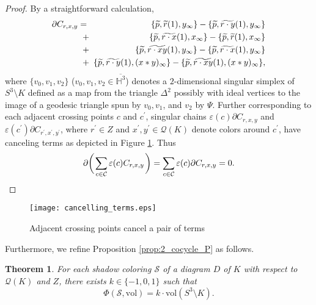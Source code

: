 \documentclass[12pt]{amsart}
\newtheorem{theorem}{Theorem}[section]
\theoremstyle{definition}
\begin{document}
\begin{proof}
By a straightforward calculation,
\begin{eqnarray*}
 \partial C_{r, x, y} = & \hskip -0.5em & \hskip -0.5em \{ \widetilde{p}, \widetilde{r}(1), y_{\infty} \} - \{ \widetilde{p}, \widetilde{r \cdot y}(1), y_{\infty} \} \\
 & \hskip -0.5em + & \hskip -0.5em \{ \widetilde{p}, \widetilde{r \cdot x}(1), x_{\infty} \} - \{ \widetilde{p}, \widetilde{r}(1), x_{\infty} \} \\
 & \hskip -0.5em + & \hskip -0.5em \{ \widetilde{p}, \widetilde{r \cdot x y}(1), y_{\infty} \} - \{ \widetilde{p}, \widetilde{r \cdot x}(1), y_{\infty} \} \\
 & \hskip -0.5em + & \hskip -0.5em \{ \widetilde{p}, \widetilde{r \cdot y}(1), (x \ast y)_{\infty} \} - \{ \widetilde{p}, \widetilde{r \cdot x y}(1), (x \ast y)_{\infty} \},
\end{eqnarray*}
where $\{ v_{0}, v_{1}, v_{2} \}$ ($v_{0}, v_{1}, v_{2} \in \overline{\mathbb{H}^{3}}$) denotes a $2$-dimensional singular simplex of $S^{3} \setminus K$ defined as a map from the triangle $\Delta^{2}$ possibly with ideal vertices to the image of a geodesic triangle spun by $v_{0}, v_{1}$, and $v_{2}$ by $\Psi$.
Further corresponding to each adjacent crossing points $c$ and $c^{\prime}$, singular chains $\varepsilon(c) \partial C_{r, x, y}$ and $\varepsilon(c^{\prime}) \partial C_{r^{\prime}, x^{\prime}, y^{\prime}}$, where $r^{\prime} \in Z$ and $x^{\prime}, y^{\prime} \in \mathcal{Q}(K)$ denote colors around $c^{\prime}$, have canceling terms as depicted in Figure \ref{fig:cancelling_terms}.
Thus
\[
 \partial \biggl( \hskip 0.1em \sum_{c \in \mathcal{C}} \varepsilon(c) C_{r, x, y} \hskip 0.1em \biggr) = \sum_{c \in \mathcal{C}} \varepsilon(c) \partial C_{r, x, y} = 0.
\]
\end{proof}

\begin{figure}[htb]
\begin{center}
\texttt{[image: cancelling\_terms.eps]}
\end{center}
\vspace{-32pt}
\caption{Adjacent crossing points cancel a pair of terms}
\label{fig:cancelling_terms}
\end{figure}

Furthermore, we refine Proposition \ref{prop:2_cocycle_P} as follows.

\begin{theorem}\label{thm:2_cocycle}
For each shadow coloring $\mathcal{S}$ of a diagram $D$ of $K$ with respect to $\mathcal{Q}(K)$ and $Z$, there exists $k \in \{ -1, 0, 1 \}$ such that
\[
 \Phi(\mathcal{S}, \mathrm{vol}) = k \cdot \mathrm{vol}(S^{3} \setminus K).
\]
\end{theorem}
\end{document}
